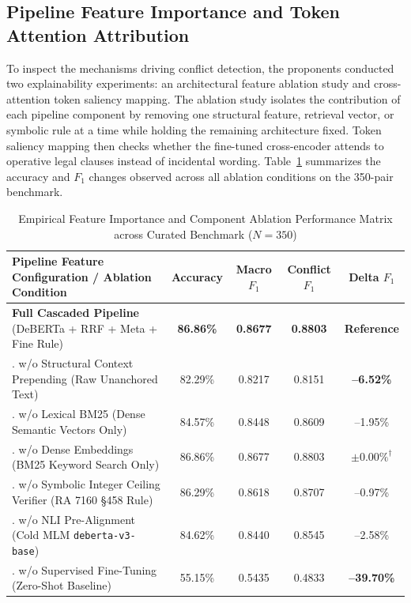 \subsection{Pipeline Feature Importance and Token Attention Attribution}
\label{sec:feature_importance_ablation}

To inspect the mechanisms driving conflict detection, the proponents conducted two explainability experiments: an architectural feature ablation study and cross-attention token saliency mapping. The ablation study isolates the contribution of each pipeline component by removing one structural feature, retrieval vector, or symbolic rule at a time while holding the remaining architecture fixed. Token saliency mapping then checks whether the fine-tuned cross-encoder attends to operative legal clauses instead of incidental wording. Table~\ref{tab:pipeline_feature_ablation} summarizes the accuracy and $F_1$ changes observed across all ablation conditions on the 350-pair benchmark.

\begin{table}[htbp]
    \centering
    \footnotesize
    \setlength{\tabcolsep}{3.5pt}
    \renewcommand{\arraystretch}{0.84}
    \caption[Pipeline Component and Feature Ablation Performance Matrix]{Empirical Feature Importance and Component Ablation Performance Matrix across Curated Benchmark ($N = 350$)}
    \label{tab:pipeline_feature_ablation}
    \begin{tabularx}{\linewidth}{>{\RaggedRight\arraybackslash}Xcccc}
        \toprule
        \textbf{Pipeline Feature Configuration / Ablation Condition} & \textbf{Accuracy} & \textbf{Macro $F_1$} & \textbf{Conflict $F_1$} & \textbf{Delta $F_1$} \\
        \midrule
        \textbf{Full Cascaded Pipeline} (DeBERTa + RRF + Meta + Fine Rule) & \textbf{86.86\%} & \textbf{0.8677} & \textbf{0.8803} & \textbf{Reference} \\
        \midrule
        1. w/o Structural Context Prepending (Raw Unanchored Text) & 82.29\% & 0.8217 & 0.8151 & \textbf{--6.52\%} \\
        2. w/o Lexical BM25 (Dense Semantic Vectors Only) & 84.57\% & 0.8448 & 0.8609 & --1.95\% \\
        3. w/o Dense Embeddings (BM25 Keyword Search Only) & 86.86\% & 0.8677 & 0.8803 & $\pm 0.00\%^{\dagger}$ \\
        4. w/o Symbolic Integer Ceiling Verifier (RA 7160 \S458 Rule) & 86.29\% & 0.8618 & 0.8707 & --0.97\% \\
        5. w/o NLI Pre-Alignment (Cold MLM \texttt{deberta-v3-base}) & 84.62\% & 0.8440 & 0.8545 & --2.58\% \\
        6. w/o Supervised Fine-Tuning (Zero-Shot Baseline) & 55.15\% & 0.5435 & 0.4833 & \textbf{--39.70\%} \\
        \bottomrule
    \end{tabularx}
\end{table}

